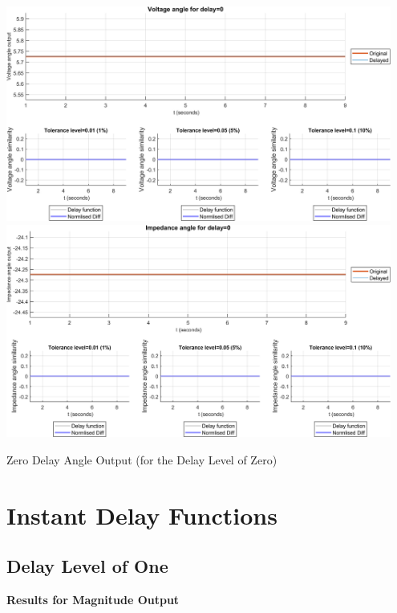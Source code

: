 \begin{floatingfigure}[p]{\textwidth}
    \includegraphics[width=0.95\textwidth]{PMUsim-figures/DelayOf_0/Zero_vAngle.png}    
     \includegraphics[width=0.95\textwidth]{PMUsim-figures/DelayOf_0/Zero_iAngle.png} 
          \caption{Zero Delay Angle Output (for the Delay Level of Zero)}

              \label{fig:PMUsim_Zero_Angle}
\end{floatingfigure}


\section{Instant Delay Functions}
\newpage \subsection{Delay Level of One}
\textbf{Results for Magnitude Output}

